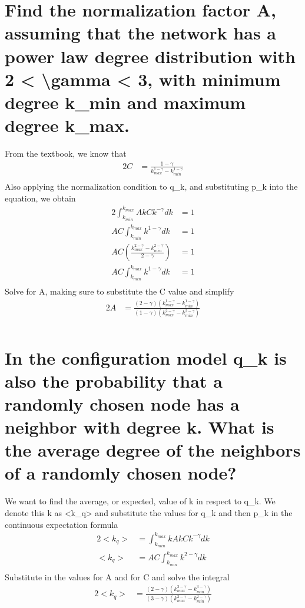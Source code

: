 \documentclass{article}%
\begin{document}
%
\normalsize%
\section{Find the normalization factor A, assuming that the network has a power law degree distribution with 2 < \textbackslash{}gamma < 3, with minimum degree k\_min and maximum degree k\_max.}%
\label{sec:FindthenormalizationfactorA,assumingthatthenetworkhasapowerlawdegreedistributionwith2<gamma<3,withminimumdegreekminandmaximumdegreekmax.}%
From the textbook, we know that %
\begin{alignat*}{2}%
C&=\frac{1-\gamma}{k_{max}^{1-\gamma}-k_{min}^{1-\gamma}}\\%
\end{alignat*}%
Also applying the normalization condition to q\_k, and substituting p\_k into the equation, we obtain%
\begin{alignat*}{2}%
\int_{k_{min}}^{k_{max}}AkCk^{-\gamma}dk&=1\\%
AC\int_{k_{min}}^{k_{max}}k^{1-\gamma}dk&=1\\%
AC(\frac{k_{max}^{2-\gamma}-k_{min}^{2-\gamma}}{2-\gamma})&=1\\%
AC\int_{k_{min}}^{k_{max}}k^{1-\gamma}dk&=1\\%
\end{alignat*}%
Solve for A, making sure to substitute the C value and simplify%
\begin{alignat*}{2}%
A&=\frac{(2-\gamma)(k_{max}^{1-\gamma}-k_{min}^{1-\gamma})}{(1-\gamma)(k_{max}^{2-\gamma}-k_{min}^{2-\gamma})}\\%
\end{alignat*}

%
\section{In the configuration model q\_k is also the probability that a randomly chosen node has a neighbor with degree k. What is the average degree of the neighbors of a randomly chosen node?}%
\label{sec:Intheconfigurationmodelqkisalsotheprobabilitythatarandomlychosennodehasaneighborwithdegreek.Whatistheaveragedegreeoftheneighborsofarandomlychosennode?}%
We want to find the average, or expected, value of k in respect to q\_k. We denote this k as <k\_q> and substitute the values for q\_k and then p\_k in the continuous expectation formula%
\begin{alignat*}{2}%
<k_q>&=\int_{k_{min}}^{k_{max}}kAkCk^{-\gamma}dk\\%
<k_q>&=AC\int_{k_{min}}^{k_{max}}k^{2-\gamma}dk\\%
\end{alignat*}%
Substitute in the values for A and for C and solve the integral%
\begin{alignat*}{2}%
<k_q>&=\frac{(2-\gamma)(k_{max}^{3-\gamma}-k_{min}^{3-\gamma})}{(3-\gamma)(k_{max}^{2-\gamma}-k_{min}^{2-\gamma})}\\%
\end{alignat*}
\end{document}
